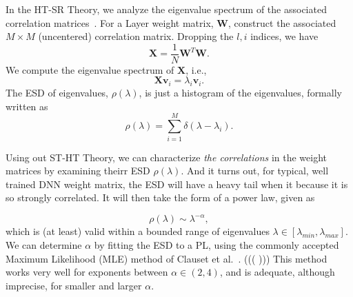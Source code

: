  
In the HT-SR Theory, we analyze the eigenvalue spectrum of the associated correlation matrices~\cite{MM18_TR}. 
For a Layer weight matrix, $\mathbf{W}$, construct the associated $M\times M$ (uncentered) correlation matrix. 
Dropping the $l,i$ indices, we have
$$
\mathbf{X} = \frac{1}{N}\mathbf{W}^{T}\mathbf{W}.
$$
We compute the eigenvalue spectrum of $\mathbf{X}$, i.e.,
$$ \mathbf{X}\mathbf{v}_{i}=\lambda_{i}\mathbf{v}_{i} .  $$
The ESD of eigenvalues, $\rho(\lambda)$, is just a histogram of the eigenvalues, formally written as
\begin{equation}
\rho(\lambda)=\sum\limits_{i=1}^{M}\delta(\lambda-\lambda_{i})  .
\label{eqn:eigenval_hist}
\end{equation}

Using out ST-HT Theory, we can characterize \emph{the correlations} in the weight matrices by examining theirr ESD $\rho(\lambda)$.
And it turns out, for  typical, well trained DNN weight matrix, the ESD will have a heavy tail when it because it is so strongly correlated.  
It will then take the form of a power law, given as

\begin{equation}
\rho(\lambda)\sim\lambda^{-\alpha}  ,
\label{eqn:eigenval_pl}
\end{equation}
which is (at least) valid within a bounded range of eigenvalues $\lambda\in[\lambda_{min},\lambda_{max}]$.  
%
We can determine $\alpha$ by fitting the   ESD to a PL, using the commonly accepted Maximum Likelihood (MLE) method of Clauset et al.~\cite{CSN09_powerlaw,ABP14}.
(((
)))
This method works very well for exponents between $\alpha\in(2,4)$, and is adequate, although imprecise, for smaller and larger $\alpha$. 

